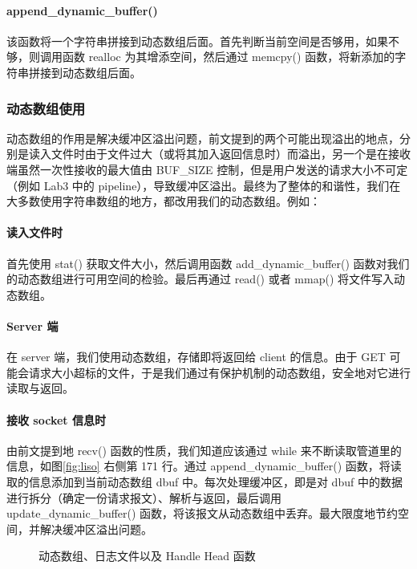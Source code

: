 \paragraph*{append\_dynamic\_buffer()} 该函数将一个字符串拼接到动态数组后面。首先判断当前空间是否够用，如果不够，则调用函数 realloc 为其增添空间，然后通过 memcpy() 函数，将新添加的字符串拼接到动态数组后面。


\subsubsection{动态数组使用}

动态数组的作用是解决缓冲区溢出问题，前文提到的两个可能出现溢出的地点，分别是读入文件时由于文件过大（或将其加入返回信息时）而溢出，另一个是在接收端虽然一次性接收的最大值由 BUF\_SIZE 控制，但是用户发送的请求大小不可定（例如 Lab3 中的 pipeline），导致缓冲区溢出。最终为了整体的和谐性，我们在大多数使用字符串数组的地方，都改用我们的动态数组。例如：

\paragraph*{读入文件时} 首先使用 stat() 获取文件大小，然后调用函数 add\_dynamic\_buffer() 函数对我们的动态数组进行可用空间的检验。最后再通过 read() 或者 mmap() 将文件写入动态数组。

\paragraph*{Server 端} 在 server 端，我们使用动态数组，存储即将返回给 client 的信息。由于 GET 可能会请求大小超标的文件，于是我们通过有保护机制的动态数组，安全地对它进行读取与返回。

\paragraph*{接收 socket 信息时} 由前文提到地 recv() 函数的性质，我们知道应该通过 while 来不断读取管道里的信息，如图\ref{fig:liso} 右侧第 171 行。通过 append\_dynamic\_buffer() 函数，将读取的信息添加到当前动态数组 dbuf 中。每次处理缓冲区，即是对 dbuf 中的数据进行拆分（确定一份请求报文）、解析与返回，最后调用 update\_dynamic\_buffer() 函数，将该报文从动态数组中丢弃。最大限度地节约空间，并解决缓冲区溢出问题。
\begin{figure}[htbp!]
    \centering
    \caption{动态数组、日志文件以及 Handle Head 函数}\label{fig:Chapter2}
\end{figure}

